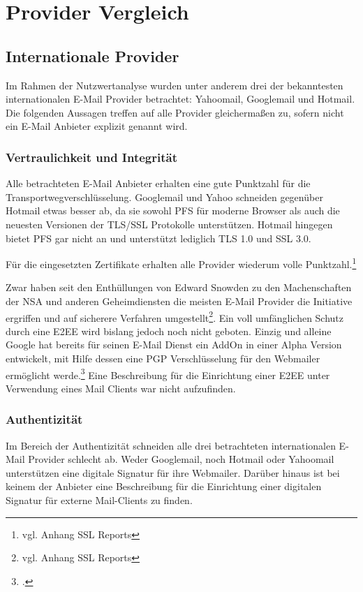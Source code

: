 \documentclass  [paper=a4,
				fontsize=12pt,
				listof=totoc,
				bibliography=totoc
				]{scrreprt}
\begin{document}
			
		\section{Provider Vergleich}\label{sec:provider-vergleich}
			\subsection{Internationale Provider}
			Im Rahmen der Nutzwertanalyse wurden unter anderem drei der bekanntesten internationalen E-Mail Provider betrachtet: Yahoomail, Googlemail und Hotmail. Die folgenden Aussagen treffen auf alle Provider gleichermaßen zu, sofern nicht ein E-Mail Anbieter explizit genannt wird.
			\medskip
			
			\subsubsection{Vertraulichkeit und Integrität}
			Alle betrachteten E-Mail Anbieter erhalten eine gute Punktzahl für die Transportwegverschlüsselung. Googlemail und Yahoo schneiden gegenüber Hotmail etwas besser ab, da sie sowohl \ac{PFS} für moderne Browser als auch die neuesten Versionen der \ac{TLS/SSL} Protokolle unterstützen. Hotmail hingegen bietet \ac{PFS} gar nicht an und unterstützt lediglich \ac{TLS} 1.0 und \ac{SSL} 3.0.
			
			Für die eingesetzten Zertifikate erhalten alle Provider wiederum volle Punktzahl.\footnote{vgl. Anhang SSL Reports}
			\medskip
			
			Zwar haben seit den Enthüllungen von Edward Snowden zu den Machenschaften der \ac{NSA} und anderen Geheimdiensten die meisten E-Mail Provider die Initiative ergriffen und  auf sicherere Verfahren umgestellt\footnote{vgl. Anhang SSL Reports}. Ein voll umfänglichen Schutz durch eine \ac{E2EE} wird bislang jedoch noch nicht geboten. Einzig und alleine Google hat bereits für seinen E-Mail Dienst ein AddOn in einer Alpha Version entwickelt, mit Hilfe dessen eine PGP Verschlüsselung für den Webmailer ermöglicht werde.\footcite[Vgl.][]{Kirsch} Eine Beschreibung für die Einrichtung einer \ac{E2EE} unter Verwendung eines Mail Clients war nicht aufzufinden.
			
			
			\subsubsection{Authentizität}
			Im Bereich der Authentizität schneiden alle drei betrachteten internationalen E-Mail Provider schlecht ab.
			Weder Googlemail, noch Hotmail oder Yahoomail unterstützen eine digitale Signatur für ihre Webmailer. Darüber hinaus ist bei keinem der Anbieter eine Beschreibung für die Einrichtung einer digitalen Signatur für externe Mail-Clients zu finden. 
			\medskip
			
\end{document}
